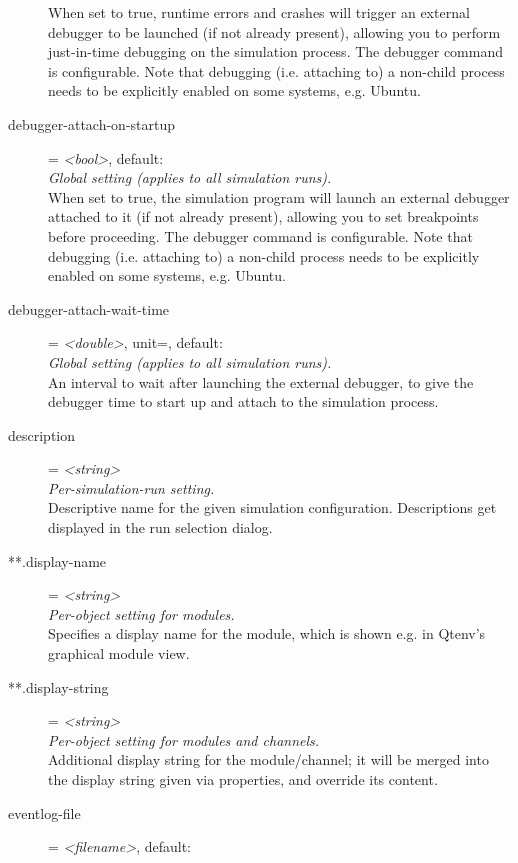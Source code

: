 \begin{description}
    When set to true, runtime errors and crashes will trigger an external
    debugger to be launched (if not already present), allowing you to perform
    just-in-time debugging on the simulation process. The debugger command is
    configurable. Note that debugging (i.e. attaching to) a non-child process
    needs to be explicitly enabled on some systems, e.g. Ubuntu.
\item[debugger-attach-on-startup] = \textit{<bool>}, default: \\
    \textit{Global setting (applies to all simulation runs).}\\
    When set to true, the simulation program will launch an external debugger
    attached to it (if not already present), allowing you to set breakpoints
    before proceeding. The debugger command is configurable. Note that
    debugging (i.e. attaching to) a non-child process needs to be explicitly
    enabled on some systems, e.g. Ubuntu.
\item[debugger-attach-wait-time] = \textit{<double>}, unit=, default: \\
    \textit{Global setting (applies to all simulation runs).}\\
    An interval to wait after launching the external debugger, to give the
    debugger time to start up and attach to the simulation process.
\item[description] = \textit{<string>}\\
    \textit{Per-simulation-run setting.}\\
    Descriptive name for the given simulation configuration. Descriptions get
    displayed in the run selection dialog.
\item[**.display-name] = \textit{<string>}\\
    \textit{Per-object setting for modules.}\\
    Specifies a display name for the module, which is shown e.g. in Qtenv's
    graphical module view.
\item[**.display-string] = \textit{<string>}\\
    \textit{Per-object setting for modules and channels.}\\
    Additional display string for the module/channel; it will be merged into
    the display string given via  properties, and
    override its content.
\item[eventlog-file] = \textit{<filename>}, default: \\

\end{description}

